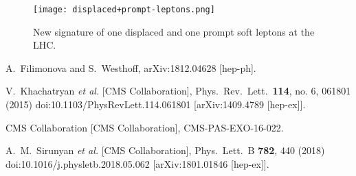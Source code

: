 \documentclass[12pt,letterpaper,notitlepage]{article}
\begin{document}
\begin{figure}[H]
\centering
\texttt{[image: displaced+prompt-leptons.png]}
\caption{\label{fig:2displaced_diagram}New signature of one displaced and one prompt soft leptons at the LHC.}
\end{figure}

\begin{thebibliography}{6}

  A.~Filimonova and S.~Westhoff,
  arXiv:1812.04628 [hep-ph].

    V.~Khachatryan {\it et al.} [CMS Collaboration],
    Phys.\ Rev.\ Lett.\  {\bf 114}, no. 6, 061801 (2015)
    doi:10.1103/PhysRevLett.114.061801
    [arXiv:1409.4789 [hep-ex]].


    CMS Collaboration [CMS Collaboration],
    CMS-PAS-EXO-16-022.

  A.~M.~Sirunyan {\it et al.} [CMS Collaboration],
  Phys.\ Lett.\ B {\bf 782}, 440 (2018)
  doi:10.1016/j.physletb.2018.05.062
  [arXiv:1801.01846 [hep-ex]].

\end{thebibliography}
\end{document}

